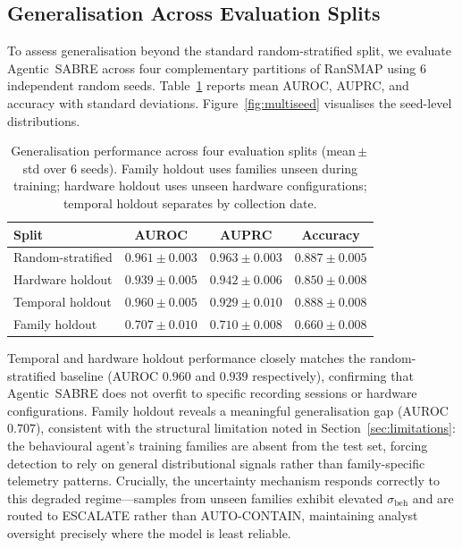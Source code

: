 \documentclass[3p]{elsarticle}
\begin{document}
\begin{changedblock}
\subsection{Generalisation Across Evaluation Splits}
\label{sec:generalisation}

To assess generalisation beyond the standard random-stratified split, we evaluate Agentic~SABRE across four complementary partitions of RanSMAP using 6 independent random seeds. Table~\ref{tab:multiseed_splits} reports mean AUROC, AUPRC, and accuracy with standard deviations. Figure~\ref{fig:multiseed} visualises the seed-level distributions.
\end{changedblock}

\begin{table}[ht]
\centering
\caption{Generalisation performance across four evaluation splits (mean\,$\pm$\,std over 6 seeds). Family holdout uses families unseen during training; hardware holdout uses unseen hardware configurations; temporal holdout separates by collection date.}
\label{tab:multiseed_splits}
\begin{tabular}{lccc}
\toprule
\textbf{Split} & \textbf{AUROC} & \textbf{AUPRC} & \textbf{Accuracy} \\
\midrule
Random-stratified & $0.961 \pm 0.003$ & $0.963 \pm 0.003$ & $0.887 \pm 0.005$ \\
Hardware holdout  & $0.939 \pm 0.005$ & $0.942 \pm 0.006$ & $0.850 \pm 0.008$ \\
Temporal holdout  & $0.960 \pm 0.005$ & $0.929 \pm 0.010$ & $0.888 \pm 0.008$ \\
Family holdout    & $0.707 \pm 0.010$ & $0.710 \pm 0.008$ & $0.660 \pm 0.008$ \\
\bottomrule
\end{tabular}
\end{table}

\begin{changedblock}
Temporal and hardware holdout performance closely matches the random-stratified baseline (AUROC $0.960$ and $0.939$ respectively), confirming that Agentic~SABRE does not overfit to specific recording sessions or hardware configurations. Family holdout reveals a meaningful generalisation gap (AUROC $0.707$), consistent with the structural limitation noted in Section~\ref{sec:limitations}: the behavioural agent's training families are absent from the test set, forcing detection to rely on general distributional signals rather than family-specific telemetry patterns. Crucially, the uncertainty mechanism responds correctly to this degraded regime---samples from unseen families exhibit elevated $\sigma_{\mathrm{beh}}$ and are routed to \textsc{ESCALATE} rather than \textsc{AUTO-CONTAIN}, maintaining analyst oversight precisely where the model is least reliable.
\end{changedblock}
\end{document}
